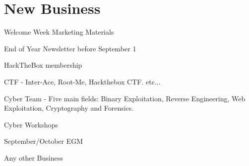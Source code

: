 \documentclass[11pt,hacksoc,agenda]{meetingmins}
\begin{document}
\section{New Business}
\begin{items}
	\item Welcome Week Marketing Materials
	\item End of Year Newsletter before September 1 
	\item HackTheBox membership
	\item CTF - Inter-Ace, Root-Me, Hackthebox CTF. etc...
	\item Cyber Team -  Five main fields: Binary Exploitation, Reverse Engineering, Web Exploitation, Cryptography and Forensics.
	\item Cyber Workshops
	\item September/October EGM
	\item Any other Business
\end{items}

\vspace{1em}
\nextmeeting{}
\end{document}
